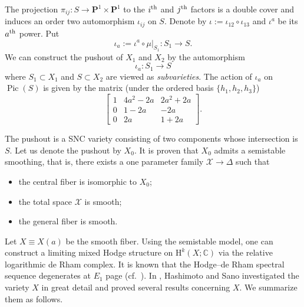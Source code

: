 The projection \(\pi_{ij}
\colon S\to \mathbf{P}^{1}\times\mathbf{P}^{1}\) to the
\(i\textsuperscript{th}\) and \(j\textsuperscript{th}\) factors
is a double cover and induces an order two automorphism \(\iota_{ij}\)
on \(S\). Denote by \(\iota:=\iota_{12}\circ\iota_{13}\)
and \(\iota^{a}\) be its \(a\textsuperscript{th}\) power.
Put 
\begin{equation}
\iota_{a}:=\left.\iota^{a}\circ \mu\right|_{S_{1}}\colon S_{1}\to S.
\end{equation}
We can construct the pushout of \(X_{1}\) and \(X_{2}\) by 
the automorphism
\begin{equation}
\iota_{a}\colon S_{1}\to S
\end{equation}
where \(S_{1}\subset X_{1}\) and \(S\subset X_{2}\)
are viewed as \emph{subvarieties}. The action of \(\iota_{a}\)
on \(\operatorname{Pic}(S)\) is given by the matrix
(under the ordered basis \(\{h_{1},h_{2},h_{3}\}\))
\begin{equation}
\begin{bmatrix}
1 & 4a^{2}-2a & 2a^{2}+2a\\
0 & 1-2a & -2a\\
0 & 2a & 1+2a
\end{bmatrix}.
\end{equation}

The pushout is a SNC variety consisting 
of two components whose intersection is \(S\). Let us denote 
the pushout by \(X_{0}\). It is proven that \(X_{0}\) admits a 
semistable smoothing, that is, there exists a one
parameter family \(\mathcal{X}\to \Delta\) such that
\begin{itemize}
\item the central fiber is isomorphic to \(X_{0}\);
\item the total space \(\mathcal{X}\) is smooth;
\item the general fiber is smooth.
\end{itemize}

Let \(X\equiv X(a)\) be the smooth fiber. 
Using the semistable model, one can construct a limiting 
mixed Hodge structure on \(\mathrm{H}^{k}(X;\mathbb{C})\)
via the relative logarithmic de Rham complex. 
It is known that the Hodge--de Rham spectral sequence degenerates at \(E_{1}\) page
(cf.~\cite{2008-Peters-Steenbrink-mixed-Hodge-structures}).
In \cite{2023-Hashimoto-Sano-examples-of-non-kahler-calabi-yau-3-folds-with-arbitrarily-large-b2}, 
Hashimoto and Sano investigated 
the variety \(X\) in great detail and 
proved several results concerning \(X\). We summarize them as follows.

